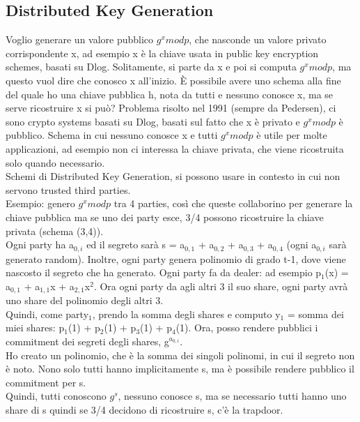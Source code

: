 \documentclass[16px]{article}
\begin{document}
\subsection{Distributed Key Generation}
Voglio generare un valore pubblico $g^xmodp$, che nasconde un valore privato corrispondente x, ad esempio x è la chiave usata in public key encryption schemes, basati su Dlog. Solitamente, si parte da x e poi si computa $g^xmodp$, ma questo vuol dire che conosco x all'inizio. È possibile avere uno schema alla fine del quale ho una chiave pubblica h, nota da tutti e nessuno conosce x, ma se serve ricostruire x si può? Problema risolto nel 1991 (sempre da Pedersen), ci sono crypto systems basati su Dlog, basati sul fatto che x è privato e $g^xmodp$ è pubblico. Schema in cui nessuno conosce x e tutti $g^xmodp$ è utile per molte applicazioni, ad esempio non ci interessa la chiave privata, che viene ricostruita solo quando necessario.\\ Schemi di Distributed Key Generation, si possono usare in contesto in cui non servono trusted third parties. \\ Esempio: genero $g^xmodp$ tra 4 parties, così che queste collaborino per generare la chiave pubblica ma se uno dei party esce, 3/4 possono ricostruire la chiave privata (schema (3,4)).\\ Ogni party ha a$_{0,i}$ ed il segreto sarà s = a$_{0,1}$ + a$_{0,2}$ + a$_{0,3}$ + a$_{0,4}$ (ogni a$_{0,i}$ sarà generato random). Inoltre, ogni party genera polinomio di grado t-1, dove viene nascosto il segreto che ha generato. Ogni party fa da dealer: ad esempio p$_1$(x) =  a$_{0,1}$ + a$_{1,1}$x + a$_{2,1}$x$^2$. Ora ogni party da agli altri 3 il suo share, ogni party avrà uno share del polinomio degli altri 3.\\ Quindi, come party$_1$, prendo la somma degli shares e computo y$_1$ = somma dei miei shares: p$_1$(1) +  p$_2$(1) + p$_3$(1) + p$_4$(1). Ora, posso rendere pubblici i commitment dei segreti degli shares, g$^{a_{0,i}}$.\\ Ho creato un polinomio, che è la somma dei singoli polinomi, in cui il segreto non è noto. Nono solo tutti hanno implicitamente s, ma è possibile rendere pubblico il commitment per s.\\ Quindi, tutti conoscono $g^s$, nessuno conosce s, ma se necessario tutti hanno uno share di s quindi se 3/4 decidono di ricostruire s, c'è la trapdoor.
\end{document}
